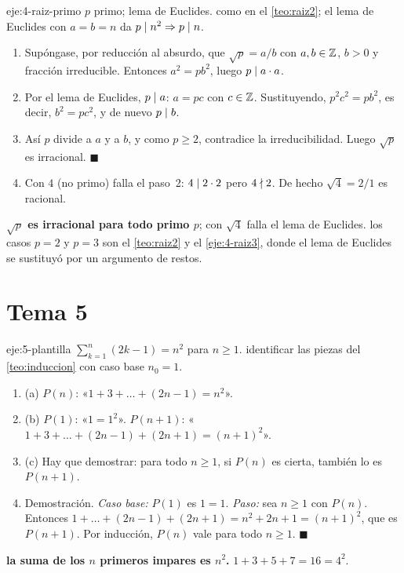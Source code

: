 \begin{solucion}{eje:4-raiz-primo}
\datos $p$ primo; lema de Euclides.
\planteamiento como en el \cref{teo:raiz2}; el lema de Euclides con $a=b=n$ da $p\mid n^{2}\Rightarrow p\mid n$.
\pasos
\begin{enumerate}[label=\arabic*.]
  \item Supóngase, por reducción al absurdo, que $\sqrt p=a/b$ con $a,b\in\mathbb{Z}$, $b>0$ y fracción irreducible. Entonces $a^{2}=pb^{2}$, luego $p\mid a\cdot a$.
  \item Por el lema de Euclides, $p\mid a$: $a=pc$ con $c\in\mathbb{Z}$. Sustituyendo, $p^{2}c^{2}=pb^{2}$, es decir, $b^{2}=pc^{2}$, y de nuevo $p\mid b$.
  \item Así $p$ divide a $a$ y a $b$, y como $p\ge 2$, contradice la irreducibilidad. Luego $\sqrt p$ es irracional. $\blacksquare$
  \item Con $4$ (no primo) falla el paso~2: $4\mid 2\cdot 2$ pero $4\nmid 2$. De hecho $\sqrt4=2/1$ es racional.
\end{enumerate}
\resultado \textbf{$\sqrt p$ es irracional para todo primo $p$}; con $\sqrt4$ falla el lema de Euclides.
\comprobacion los casos $p=2$ y $p=3$ son el \cref{teo:raiz2} y el \cref{eje:4-raiz3}, donde el lema de Euclides se sustituyó por un argumento de restos.
\end{solucion}

\section{Tema 5}

\begin{solucion}{eje:5-plantilla}
\datos $\sum_{k=1}^{n}(2k-1)=n^{2}$ para $n\ge 1$.
\planteamiento identificar las piezas del \cref{teo:induccion} con caso base $n_0=1$.
\pasos
\begin{enumerate}[label=\arabic*.]
  \item (a) $P(n)$: «$1+3+\dots+(2n-1)=n^{2}$».
  \item (b) $P(1)$: «$1=1^{2}$». $P(n+1)$: «$1+3+\dots+(2n-1)+(2n+1)=(n+1)^{2}$».
  \item (c) Hay que demostrar: para todo $n\ge 1$, si $P(n)$ es cierta, también lo es $P(n+1)$.
  \item Demostración. \emph{Caso base:} $P(1)$ es $1=1$. \emph{Paso:} sea $n\ge 1$ con $P(n)$. Entonces $1+\dots+(2n-1)+(2n+1)=n^{2}+2n+1=(n+1)^{2}$, que es $P(n+1)$. Por inducción, $P(n)$ vale para todo $n\ge 1$. $\blacksquare$
\end{enumerate}
\resultado \textbf{la suma de los $n$ primeros impares es $n^{2}$.}
\comprobacion $1+3+5+7=16=4^{2}$.
\end{solucion}

